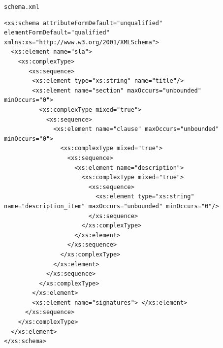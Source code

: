 \documentclass[12pt]{article}
\begin{document}
\texttt{schema.xml}
\begin{lstlisting}
<xs:schema attributeFormDefault="unqualified" elementFormDefault="qualified" xmlns:xs="http://www.w3.org/2001/XMLSchema">
  <xs:element name="sla">
    <xs:complexType>
       <xs:sequence>
        <xs:element type="xs:string" name="title"/>
        <xs:element name="section" maxOccurs="unbounded" minOccurs="0"> 
          <xs:complexType mixed="true">
            <xs:sequence>
              <xs:element name="clause" maxOccurs="unbounded" minOccurs="0">
                <xs:complexType mixed="true">
                  <xs:sequence>
                    <xs:element name="description">
                      <xs:complexType mixed="true">
                        <xs:sequence>
                          <xs:element type="xs:string" name="description_item" maxOccurs="unbounded" minOccurs="0"/>
                        </xs:sequence>
                      </xs:complexType>
                    </xs:element>
                  </xs:sequence>
                </xs:complexType>
              </xs:element>
            </xs:sequence>
          </xs:complexType>
        </xs:element>
        <xs:element name="signatures"> </xs:element>
      </xs:sequence>
    </xs:complexType>
  </xs:element>
</xs:schema>
\end{lstlisting}
\end{document}
